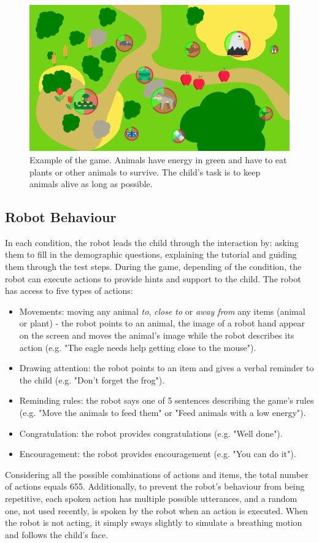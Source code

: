 \begin{figure}[ht]
	\centering
		\includegraphics[width=1\textwidth]{game.png}
		\caption{Example of the game. Animals have energy in green and have to eat plants or other animals to survive. The child's task is to keep animals alive as long as possible.}
		\label{fig:tutoring_game}
\end{figure}

\subsection{Robot Behaviour} \label{sec:tuto_robot}
In each condition, the robot leads the child through the interaction by: asking them to fill in the demographic questions, explaining the tutorial and guiding them through the test steps. During the game, depending of the condition, the robot can execute actions to provide hints and support to the child. The robot has access to five types of actions:
\begin{itemize}
	\item Movements: moving any animal \emph{to}, \emph{close to} or \emph{away from} any items (animal or plant) - the robot points to an animal, the image of a robot hand appear on the screen and moves the animal's image while the robot describes its action (e.g. "The eagle needs help getting close to the mouse").
	\item Drawing attention: the robot points to an item and gives a verbal reminder to the child (e.g. "Don't forget the frog").
	\item Reminding rules: the robot says one of 5 sentences describing the game's rules (e.g. "Move the animals to feed them" or "Feed animals with a low energy").
	\item Congratulation: the robot provides congratulations (e.g. "Well done").
	\item Encouragement: the robot provides encouragement (e.g. "You can do it").
\end{itemize}
Considering all the possible combinations of actions and items, the total number of actions equals 655. Additionally, to prevent the robot's behaviour from being repetitive, each spoken action has multiple possible utterances, and a random one, not used recently, is spoken by the robot when an action is executed. When the robot is not acting, it simply sways slightly to simulate a breathing motion and follows the child's face. 

